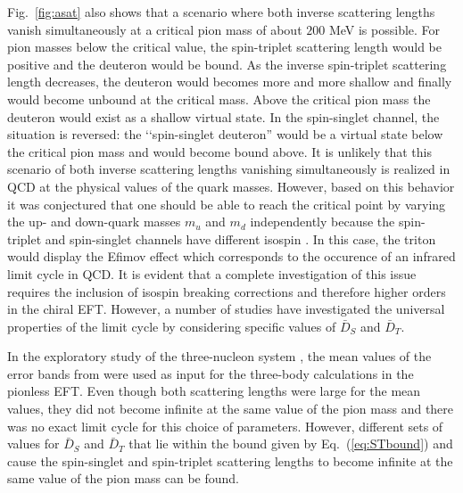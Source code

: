 \documentclass[aps,rmp,nofootinbib,twocolumn,floatfix]{revtex4}
\begin{document}
Fig.~\ref{fig:asat} also shows that a scenario where 
both inverse scattering lengths vanish simultaneously
at a critical pion mass of about $200$ MeV
is possible. For pion masses below the critical value, the spin-triplet
scattering length would be positive and the deuteron would be bound. 
As the inverse spin-triplet scattering length decreases, 
the deuteron would becomes more and more
shallow and finally would become unbound at the critical mass. 
Above the critical pion mass the deuteron would exist as a shallow virtual 
state.  In the spin-singlet channel, the situation is reversed: the 
\lq\lq spin-singlet deuteron'' would be a virtual state below the 
critical pion mass and would become bound above. 
It is unlikely that this scenario of both inverse scattering lengths
vanishing simultaneously is realized in QCD at the physical
values of the quark masses. 
However, based on this behavior it was conjectured that 
one should be able to reach the critical point by varying  
the up- and down-quark masses $m_u$ and $m_d$ independently
because the spin-triplet and spin-singlet channels have different isospin
\cite{Braaten:2003eu}.
In this case, the triton would display the Efimov effect which
corresponds to the occurence of an infrared limit cycle in QCD.
It is evident that a complete investigation 
of this issue requires the inclusion
of isospin breaking corrections and therefore higher orders in the chiral
EFT. However, a number of studies have investigated the universal 
properties of the limit cycle by considering specific values of
$\bar D_{S}$ and $\bar D_{T}$.

In the exploratory study of
the three-nucleon system \cite{Braaten:2003eu}, the mean values of the 
error bands from \cite{Epelbaum:2002gb}
were used as input for the three-body calculations in the 
pionless EFT. 
Even though both scattering lengths were large for the mean values,
they did not become infinite at the same value of the pion mass and 
there was no exact limit cycle for this choice of parameters.
However, different sets of values
for $\bar D_{S}$ and $\bar D_{T}$ that lie within the bound 
given by Eq.~(\ref{eq:STbound}) and cause the spin-singlet and 
spin-triplet scattering lengths to become infinite at the same value of 
the pion mass can be found.
\end{document}
